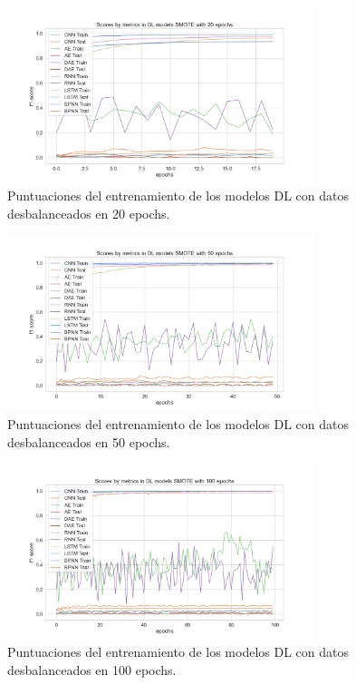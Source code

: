 \begin{figure}[h!]
	\centering
	\includegraphics[width=0.8\textwidth]{"figuras/Experimento5/SMOTE/DL_SMOTE_20_train"}
	\caption{Puntuaciones del entrenamiento de los modelos DL con datos desbalanceados en 20 epochs.}
	\label{an:20}
\end{figure}

\begin{figure}[h!]
	\centering
	\includegraphics[width=0.8\textwidth]{"figuras/Experimento5/SMOTE/DL_SMOTE_50_train"}
	\caption{Puntuaciones del entrenamiento de los modelos DL con datos desbalanceados en 50 epochs.}
	\label{an:21}
\end{figure}

\begin{figure}[h!]
	\centering
	\includegraphics[width=0.8\textwidth]{"figuras/Experimento5/SMOTE/DL_SMOTE_100_train"}
	\caption{Puntuaciones del entrenamiento de los modelos DL con datos desbalanceados en 100 epochs.}
	\label{an:22}
\end{figure}

